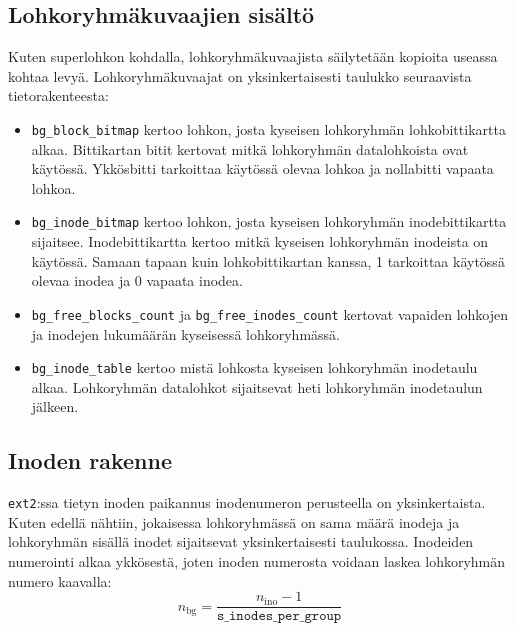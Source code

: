 \subsection{Lohkoryhmäkuvaajien sisältö}
Kuten superlohkon kohdalla, lohkoryhmäkuvaajista säilytetään kopioita useassa kohtaa levyä.
Lohkoryhmäkuvaajat on yksinkertaisesti taulukko seuraavista tietorakenteesta:
\begin{itemize}
    \item \texttt{bg\_block\_bitmap} kertoo lohkon, josta kyseisen lohkoryhmän lohkobittikartta alkaa.
          Bittikartan bitit kertovat mitkä lohkoryhmän datalohkoista ovat käytössä.
          Ykkösbitti tarkoittaa käytössä olevaa lohkoa ja nollabitti vapaata lohkoa.
    \item \texttt{bg\_inode\_bitmap} kertoo lohkon, josta kyseisen lohkoryhmän inodebittikartta sijaitsee.
          Inodebittikartta kertoo mitkä kyseisen lohkoryhmän inodeista on käytössä.
          Samaan tapaan kuin lohkobittikartan kanssa, 1 tarkoittaa käytössä olevaa inodea ja 0 vapaata inodea.
    \item \texttt{bg\_free\_blocks\_count} ja \texttt{bg\_free\_inodes\_count} kertovat vapaiden lohkojen ja inodejen lukumäärän kyseisessä lohkoryhmässä.
    \item \texttt{bg\_inode\_table} kertoo mistä lohkosta kyseisen lohkoryhmän inodetaulu alkaa. Lohkoryhmän datalohkot sijaitsevat heti lohkoryhmän inodetaulun jälkeen.
\end{itemize}

\subsection{Inoden rakenne}

\texttt{ext2}:ssa tietyn inoden paikannus inodenumeron perusteella on yksinkertaista.
Kuten edellä nähtiin, jokaisessa lohkoryhmässä on sama määrä inodeja ja lohkoryhmän sisällä inodet sijaitsevat yksinkertaisesti taulukossa.
Inodeiden numerointi alkaa ykkösestä, joten inoden numerosta voidaan laskea lohkoryhmän numero kaavalla:
$$ n_\text{bg} = \frac{n_\text{ino} - 1}{\texttt{s\_inodes\_per\_group}} $$

